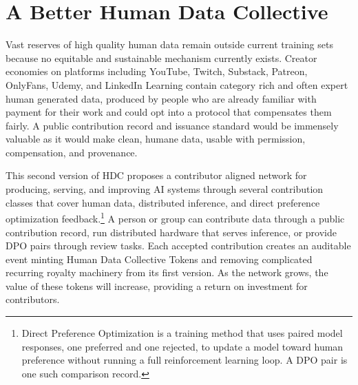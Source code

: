 \documentclass[10pt,a4paper,twocolumn]{article}
\begin{document}
\section{A Better Human Data Collective}
\label{sec:hdc}

Vast reserves of high quality human data remain outside current training sets because no equitable and sustainable mechanism currently exists. Creator economies on platforms including YouTube, Twitch, Substack, Patreon, OnlyFans, Udemy, and LinkedIn Learning contain category rich and often expert human generated data, produced by people who are already familiar with payment for their work and could opt into a protocol that compensates them fairly. A public contribution record and issuance standard would be immensely valuable as it would make clean, humane data, usable with permission, compensation, and provenance.

This second version of HDC proposes a contributor aligned network for producing, serving, and improving AI systems through several contribution classes that cover human data, distributed inference, and direct preference optimization feedback.\footnote{Direct Preference Optimization is a training method that uses paired model responses, one preferred and one rejected, to update a model toward human preference without running a full reinforcement learning loop. A DPO pair is one such comparison record.} A person or group can contribute data through a public contribution record, run distributed hardware that serves inference, or provide DPO pairs through review tasks. Each accepted contribution creates an auditable event minting Human Data Collective Tokens and removing complicated recurring royalty machinery from its first version. As the network grows, the value of these tokens will increase, providing a return on investment for contributors.

\begin{table}[H]
\centering
\scriptsize
\setlength{\abovecaptionskip}{4pt}
\setlength{\belowcaptionskip}{4pt}
\caption{HDCT issuance events. Each row maps a verified work event to HDCT issuance.}
\label{tab:issuance}
\end{table}
\end{document}
